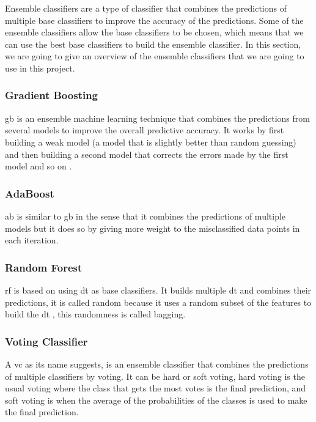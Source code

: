 Ensemble classifiers are a type of classifier that combines the predictions of multiple base classifiers to improve the accuracy of the predictions. Some of the ensemble classifiers allow the base classifiers to be chosen, which means that we can use the best base classifiers to build the ensemble classifier. In this section, we are going to give an overview of the ensemble classifiers that we are going to use in this project.



\subsubsection{Gradient Boosting}
\ac{gb} is an ensemble machine learning technique that combines the predictions from several models to improve the overall predictive accuracy. It works by first building a weak model (a model that is slightly better than random guessing) and then building a second model that corrects the errors made by the first model and so on \cite{natekin_gradient_2013}.

\subsubsection{AdaBoost}
\ac{ab} is similar to \ac{gb} in the sense that it combines the predictions of multiple models but it does so by giving more weight to the misclassified data points in each iteration.

\subsubsection{Random Forest}
\ac{rf} is based on using \ac{dt} as base classifiers. It builds multiple \ac{dt} and combines their predictions, it is called random because it uses a random subset of the features to build the \ac{dt} \cite{breiman_random_2001}, this randomness is called bagging.

\subsubsection{Voting Classifier}
A \ac{vc} as its name suggests, is an ensemble classifier that combines the predictions of multiple classifiers by voting. It can be hard or soft voting, hard voting is the usual voting where the class that gets the most votes is the final prediction, and soft voting is when the average of the probabilities of the classes is used to make the final prediction.

